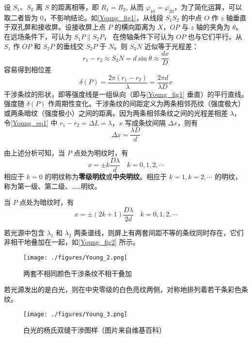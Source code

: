 设 $S_1$、$S_2$ 离 $S$ 的距离相等，即 $R_1=R_2$, 从而 $\varphi_{10}=\varphi_{20}$，为了简化运算，可以取二者皆为 $0$，不影响结论。如\autoref{Young_fig1}，从线段 $S_1S_2$ 的中点 $O$ 作 $z$ 轴垂直于双孔屏和接收屏。设接收屏上点 $P$ 的横向距离为 $X$，$OP$ 与 $z$ 轴的夹角为 $\theta$。在远场条件下，可认为 $S_1P\parallel S_2P$， 在傍轴条件下可认为 $OP$ 也与它们平行。从 $S_1$ 作 $OP$ 和 $S_2P$ 的垂线交 $S_2P$ 于 $N$。则 $\overline{S_2N}$ 近似等于光程差：
\begin{equation} \label{Young_eq1}
r_{1}-r_{2} \approx \overline{S_{2} N}=d \sin \theta \approx \frac{d x}{D}
\end{equation}
容易得到相位差
\begin{equation}
\delta(P)=\frac{2 \pi\left(r_{1}-r_{2}\right)}{\lambda}=\frac{2 \pi d}{\lambda D} x
\end{equation}
干涉条纹的形状，即等强度线是一组纵向（即与\autoref{Young_fig1} 垂直）的平行直线。强度随 $\delta(P)$ 作周期性变化。干涉条纹的间距定义为两条相邻亮纹（强度极大）或两条暗纹（强度极小）之间的距离。因为两条相邻条纹之间的光程差相差 $\lambda$， 令\autoref{Young_eq1} 中 $r_1-r_2=\Delta L=\lambda$，$ x $ 写成条纹间隔 $\Delta x$，则有
\begin{equation}
\Delta x=\frac{\lambda D}{d}
\end{equation}

由上述分析可知，当 $P$ 点处为明纹时，有
\begin{equation}
x=\pm k \frac{D \lambda}{d} \quad k=0,1,2, \cdots
\end{equation}
相应于 $k=0$ 的明纹称为\textbf{零级明纹}或\textbf{中央明纹}。相应于 $k=1, k=2, \cdots$ 的明纹，称为第一级、第二级、……明纹。

当 $P$ 点处为暗纹时，有
\begin{equation}
x=\pm(2 k+1) \frac{D \lambda}{2 d} \quad k=0,1,2, \cdots
\end{equation}

若光源中包含 $\lambda_1$ 和 $\lambda_2$ 两条谱线，则屏上有两套间距不等的条纹同时存在，它们非相干地叠加在一起，如\autoref{Young_fig2} 所示。
\begin{figure}[ht]
\centering
\texttt{[image: ./figures/Young\_2.png]}
\caption{两套不相同颜色干涉条纹不相干叠加} \label{Young_fig2}
\end{figure}
若光源发出的是白光，则在中央零级的白色亮纹两侧，对称地排列着若干条彩色条纹。
\begin{figure}[ht]
\centering
\texttt{[image: ./figures/Young\_3.png]}
\caption{白光的杨氏双缝干涉图样（图片来自维基百科）} \label{Young_fig3}
\end{figure}
